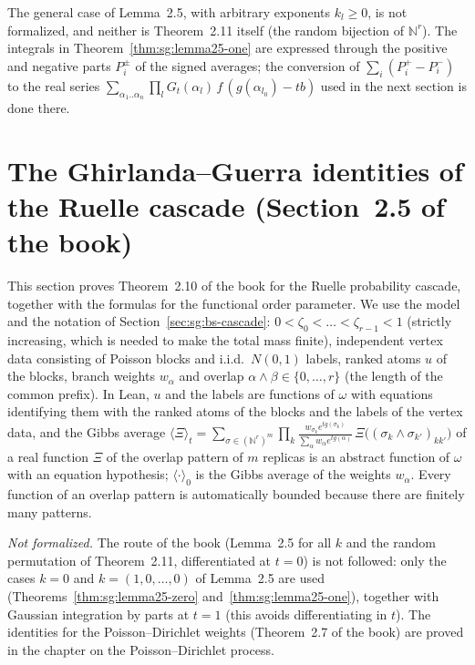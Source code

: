\begin{remark}
The general case of Lemma~2.5, with arbitrary exponents $k_l\ge0$, is not formalized, and neither is Theorem~2.11 itself (the random bijection of $\mathbb N^r$).
The integrals in Theorem~\ref{thm:sg:lemma25-one} are expressed through the positive and negative parts $P_i^\pm$ of the signed averages;
the conversion of $\sum_i(P_i^+-P_i^-)$ to the real series $\sum_{\alpha_1..\alpha_n}\prod_l G_t(\alpha_l)\,f\,(g(\alpha_{l_0})-tb)$ used in the next section is done there.
\end{remark}


\section{The Ghirlanda--Guerra identities of the Ruelle cascade (Section~2.5 of the book)}\label{sec:sg:gg-cascade}

This section proves Theorem~2.10 of the book for the Ruelle probability cascade, together with the formulas for the functional order parameter.
We use the model and the notation of Section~\ref{sec:sg:bs-cascade}: $0<\zeta_0<\dots<\zeta_{r-1}<1$ (strictly increasing, which is needed to make the total
mass finite), independent vertex data consisting of Poisson blocks and i.i.d.\ $N(0,1)$ labels, ranked atoms $u$ of the blocks, branch weights $w_\alpha$ and
overlap $\alpha\wedge\beta\in\{0,\dots,r\}$ (the length of the common prefix). In Lean, $u$ and the labels are functions of $\omega$ with equations
identifying them with the ranked atoms of the blocks and the labels of the vertex data, and the Gibbs average
$\langle\Xi\rangle_t=\sum_{\sigma\in(\mathbb N^r)^m}\prod_{k}\frac{w_{\sigma_k}e^{tg(\sigma_k)}}{\sum_\alpha w_\alpha e^{tg(\alpha)}}\,\Xi\big((\sigma_k\wedge\sigma_{k'})_{kk'}\big)$ of a real
function $\Xi$ of the overlap pattern of $m$ replicas is an abstract function of $\omega$ with an equation hypothesis; $\langle\cdot\rangle_0$ is the Gibbs average of the weights $w_\alpha$.
Every function of an overlap pattern is automatically bounded because there are finitely many patterns.

\emph{Not formalized.} The route of the book (Lemma~2.5 for all $k$ and the random permutation of Theorem~2.11, differentiated at $t=0$) is not followed: only the cases
$k=0$ and $k=(1,0,\dots,0)$ of Lemma~2.5 are used (Theorems~\ref{thm:sg:lemma25-zero} and~\ref{thm:sg:lemma25-one}), together with Gaussian integration by parts at $t=1$
(this avoids differentiating in $t$). The identities for the Poisson--Dirichlet weights (Theorem~2.7 of the book) are proved in the chapter on the Poisson--Dirichlet process.

